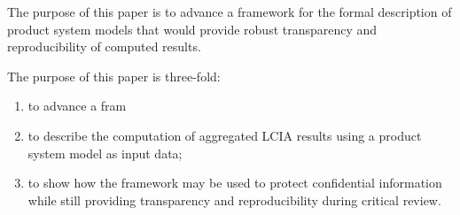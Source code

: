 The purpose of this paper is to advance a framework for the formal description of product system models that would provide robust transparency and reproducibility of computed results.  



The purpose of this paper is three-fold:
\begin{enumerate}[label=\roman*.]
\item to advance a fram
\item to describe the computation of aggregated LCIA results using a product system model as input data;
\item to show how the framework may be used to protect confidential information while still providing transparency and reproducibility during critical review.
\end{enumerate}



\endinput

o advance a framework for the formal description of a subset of LCA studies that can be used to document, validate, and reproduce the computations that lead from model specification to LCIA results.  The framework can also 


But reproducibility of a computation requires a distinction between the computing algorithm and the input data \citep{Buckheit_1995, }; contemporary LCA lacks this distinction.  





What is the point of the new paper?


Some thoughts to put together and rearrange:


 * 

 * When a study is reviewed, it is often the written documentation and \emph{not} the product system model itself that is the object of review.  

  - In current practice, it is the responsibility of the study author to ensure that the written report accurately describes the model.  

  - Because the model itself may not be available for review, it is impossible for a reviewer to directly evaluate the author's claim that the model is accurately represented.


or for distinguishing between the foreground and the background of a model.





 * 
 
 * In the process of aggregating the models, much of the information about their construction is lost.  This is partly by design, in order to protect the privacy of the input data \citep[Ch. 3]{UNEP_2011}.



